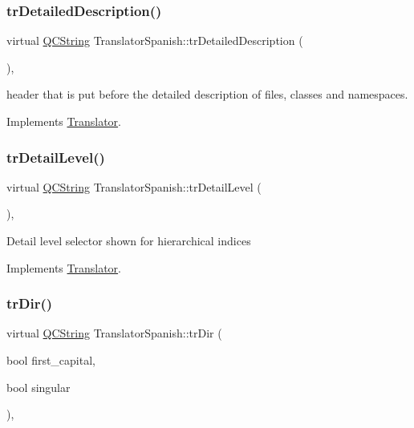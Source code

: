 \subsubsection{\texorpdfstring{trDetailedDescription()}{trDetailedDescription()}}
{\footnotesize\ttfamily virtual \mbox{\hyperlink{class_q_c_string}{Q\+C\+String}} Translator\+Spanish\+::tr\+Detailed\+Description (\begin{DoxyParamCaption}{ }\end{DoxyParamCaption})\hspace{0.3cm}{\ttfamily [inline]}, {\ttfamily [virtual]}}

header that is put before the detailed description of files, classes and namespaces. 

Implements \mbox{\hyperlink{class_translator}{Translator}}.

\mbox{\label{class_translator_spanish_a7229264c23cf87fbdc17ebf0caef5f0a}} 
\subsubsection{\texorpdfstring{trDetailLevel()}{trDetailLevel()}}
{\footnotesize\ttfamily virtual \mbox{\hyperlink{class_q_c_string}{Q\+C\+String}} Translator\+Spanish\+::tr\+Detail\+Level (\begin{DoxyParamCaption}{ }\end{DoxyParamCaption})\hspace{0.3cm}{\ttfamily [inline]}, {\ttfamily [virtual]}}

Detail level selector shown for hierarchical indices 

Implements \mbox{\hyperlink{class_translator}{Translator}}.

\mbox{\label{class_translator_spanish_a629506b6975846e5202963f1e74a5da9}} 
\subsubsection{\texorpdfstring{trDir()}{trDir()}}
{\footnotesize\ttfamily virtual \mbox{\hyperlink{class_q_c_string}{Q\+C\+String}} Translator\+Spanish\+::tr\+Dir (\begin{DoxyParamCaption}\item[{bool}]{first\+\_\+capital,  }\item[{bool}]{singular }\end{DoxyParamCaption})\hspace{0.3cm}{\ttfamily [inline]}, {\ttfamily [virtual]}}

